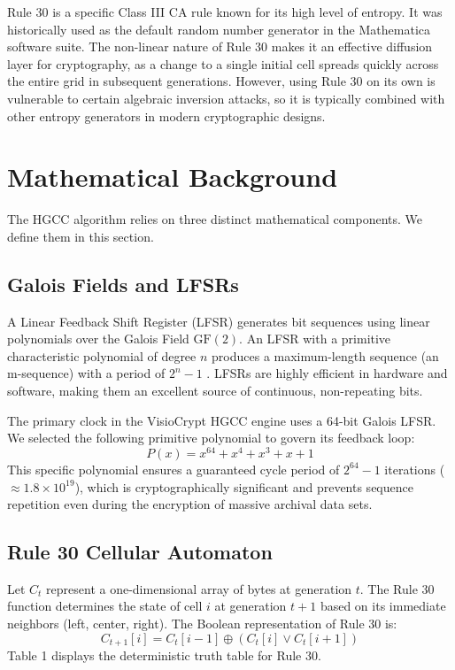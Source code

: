 \documentclass[runningheads]{llncs}
\begin{document}
Rule 30 is a specific Class III CA rule known for its high level of entropy. It was historically used as the default random number generator in the Mathematica software suite. The non-linear nature of Rule 30 makes it an effective diffusion layer for cryptography, as a change to a single initial cell spreads quickly across the entire grid in subsequent generations. However, using Rule 30 on its own is vulnerable to certain algebraic inversion attacks, so it is typically combined with other entropy generators in modern cryptographic designs.

\section{Mathematical Background}
The HGCC algorithm relies on three distinct mathematical components. We define them in this section.

\subsection{Galois Fields and LFSRs}
A Linear Feedback Shift Register (LFSR) generates bit sequences using linear polynomials over the Galois Field $\text{GF}(2)$. An LFSR with a primitive characteristic polynomial of degree $n$ produces a maximum-length sequence (an m-sequence) with a period of $2^n - 1$ \cite{rueppel1986,golomb1981}. LFSRs are highly efficient in hardware and software, making them an excellent source of continuous, non-repeating bits.

The primary clock in the VisioCrypt HGCC engine uses a 64-bit Galois LFSR. We selected the following primitive polynomial to govern its feedback loop:
\begin{equation}
P(x) = x^{64} + x^4 + x^3 + x + 1
\end{equation}
This specific polynomial ensures a guaranteed cycle period of $2^{64} - 1$ iterations ($\approx 1.8 \times 10^{19}$), which is cryptographically significant and prevents sequence repetition even during the encryption of massive archival data sets.

\subsection{Rule 30 Cellular Automaton}
Let $C_t$ represent a one-dimensional array of bytes at generation $t$. The Rule 30 function determines the state of cell $i$ at generation $t+1$ based on its immediate neighbors (left, center, right). The Boolean representation of Rule 30 is:
\begin{equation}
C_{t+1}[i] = C_t[i-1] \oplus (C_t[i] \lor C_t[i+1])
\end{equation}
Table 1 displays the deterministic truth table for Rule 30.
\end{document}
